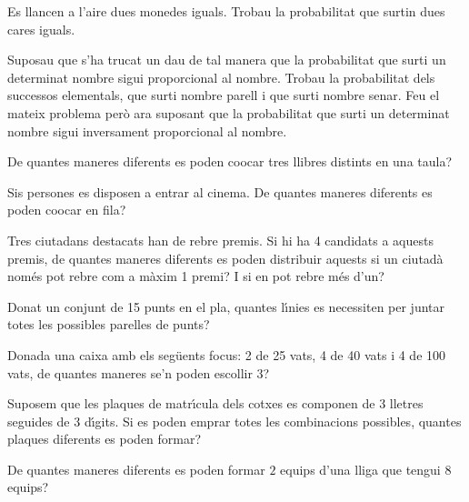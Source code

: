 \begin{prob}
{Es llancen a l'aire dues monedes iguals. Trobau la probabilitat 
que surtin dues cares iguals.}
\end{prob}

\begin{prob}
{Suposau que s'ha trucat un dau de tal manera que la probabilitat 
que surti un determinat nombre sigui proporcional al nombre. Trobau la
probabilitat dels successos elementals, que surti nombre parell i 
que surti nombre senar. Feu el mateix problema per\`o ara suposant que la
probabilitat que surti un determinat nombre sigui inversament
proporcional al nombre.}
\end{prob}

\begin{prob}
{De quantes maneres diferents es
poden co{\lgem}ocar tres llibres distints en una taula?}
\end{prob}

\begin{prob}
{Sis persones es disposen a entrar al cinema. De quantes maneres
diferents es poden co{\lgem}ocar en fila?}
\end{prob}

\begin{prob}
{Tres ciutadans destacats han de rebre premis. Si hi ha 4 candidats a
aquests premis, de quantes maneres diferents es poden distribuir aquests
si un ciutad\`a nom\'es pot rebre com a m\`axim 1 premi? I si en pot rebre m\'es
d'un?}
\end{prob}

\begin{prob}
{Donat un conjunt de 15 punts en el pla, quantes l\'{\i}nies es 
necessiten per juntar totes les possibles parelles de punts?}
\end{prob}

\begin{prob}
{Donada una caixa amb els seg\"uents focus: 2 de 25 vats, 4 de 40 vats
i 4 de 100 vats, de quantes maneres se'n poden escollir 3?}
\end{prob}

\begin{prob}
{Suposem que les plaques de matr\'{\i}cula dels cotxes es componen de 3
lletres seguides de 3 d\'{\i}gits. Si es poden emprar totes les combinacions
possibles, quantes plaques diferents es poden formar?}
\end{prob}

\begin{prob}
{De quantes maneres diferents es poden formar $2$ equips d'una lliga que
tengui $8$ equips?}
\end{prob}

